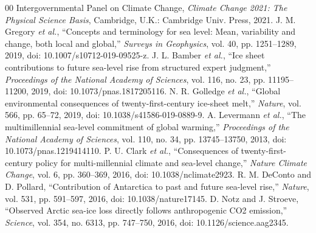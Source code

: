 \documentclass[conference]{IEEEtran}
\begin{document}
\begin{thebibliography}{00}
 Intergovernmental Panel on Climate Change, \textit{Climate Change 2021: The Physical Science Basis}, Cambridge, U.K.: Cambridge Univ. Press, 2021.
 J. M. Gregory \textit{et al.}, ``Concepts and terminology for sea level: Mean, variability and change, both local and global,'' \textit{Surveys in Geophysics}, vol. 40, pp. 1251--1289, 2019, doi: 10.1007/s10712-019-09525-z.
 J. L. Bamber \textit{et al.}, ``Ice sheet contributions to future sea-level rise from structured expert judgment,'' \textit{Proceedings of the National Academy of Sciences}, vol. 116, no. 23, pp. 11195--11200, 2019, doi: 10.1073/pnas.1817205116.
 N. R. Golledge \textit{et al.}, ``Global environmental consequences of twenty-first-century ice-sheet melt,'' \textit{Nature}, vol. 566, pp. 65--72, 2019, doi: 10.1038/s41586-019-0889-9.
 A. Levermann \textit{et al.}, ``The multimillennial sea-level commitment of global warming,'' \textit{Proceedings of the National Academy of Sciences}, vol. 110, no. 34, pp. 13745--13750, 2013, doi: 10.1073/pnas.1219414110.
 P. U. Clark \textit{et al.}, ``Consequences of twenty-first-century policy for multi-millennial climate and sea-level change,'' \textit{Nature Climate Change}, vol. 6, pp. 360--369, 2016, doi: 10.1038/nclimate2923.
 R. M. DeConto and D. Pollard, ``Contribution of Antarctica to past and future sea-level rise,'' \textit{Nature}, vol. 531, pp. 591--597, 2016, doi: 10.1038/nature17145.
 D. Notz and J. Stroeve, ``Observed Arctic sea-ice loss directly follows anthropogenic CO2 emission,'' \textit{Science}, vol. 354, no. 6313, pp. 747--750, 2016, doi: 10.1126/science.aag2345.
\end{thebibliography}
\end{document}
